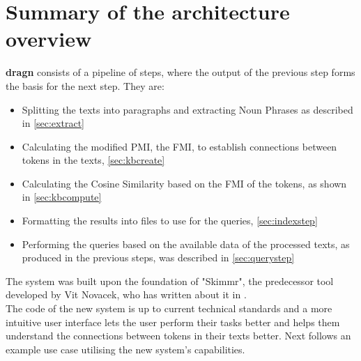 \section{Summary of the architecture overview}
\textbf{dragn} consists of a pipeline of steps, where the output of the previous step forms the basis for the next step. They are:
\begin{itemize}
\item Splitting the texts into paragraphs and extracting Noun Phrases as described in \ref{sec:extract}
\item Calculating the modified PMI, the FMI, to establish connections between tokens in the texts, \ref{sec:kbcreate}
\item Calculating the Cosine Similarity based on the FMI of the tokens, as shown in \ref{sec:kbcompute}
\item Formatting the results into files to use for the queries, \ref{sec:indexstep}
\item Performing the queries based on the available data of the processed texts, as produced in the previous steps, was described in \ref{sec:querystep}
\end{itemize}
The system was built upon the foundation of "Skimmr", the predecessor tool developed by Vit Novacek, who has written about it in \cite{novavcek2014skimmr}.\\
The code of the new system is up to current technical standards and a more intuitive user interface lets the user perform their tasks better and helps them understand the connections between tokens in their texts better.
Next follows an example use case utilising the new system's capabilities.